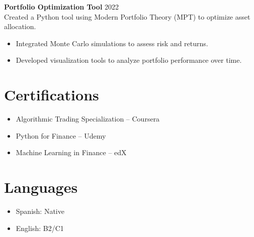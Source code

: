 \documentclass{article}
\begin{document}
\textbf{Portfolio Optimization Tool} \hfill 2022 \\
Created a Python tool using Modern Portfolio Theory (MPT) to optimize asset allocation.
\begin{itemize}
    \item Integrated Monte Carlo simulations to assess risk and returns.
    \item Developed visualization tools to analyze portfolio performance over time.
\end{itemize}

\section*{Certifications}
\begin{itemize}
    \item Algorithmic Trading Specialization – Coursera
    \item Python for Finance – Udemy
    \item Machine Learning in Finance – edX
\end{itemize}

\section*{Languages}
\begin{itemize}
    \item Spanish: Native
    \item English: B2/C1
\end{itemize}
\end{document}
